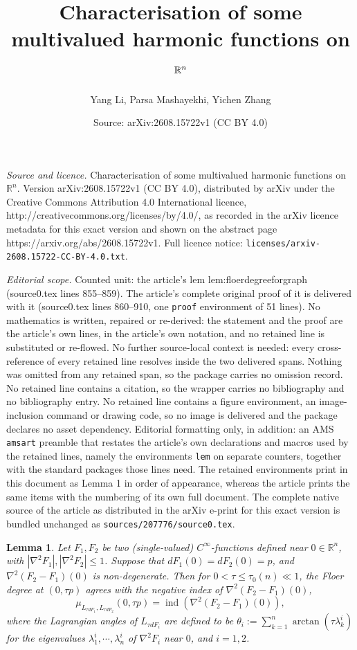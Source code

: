 \documentclass[10pt,a4paper]{amsart}
\title{Characterisation of some multivalued harmonic functions on $\R^{n}$}
\author{Yang Li, Parsa Mashayekhi, Yichen Zhang}
\date{Source: arXiv:2608.15722v1 (CC BY 4.0)}
\newtheorem{lem}{Lemma}
\newcommand{\R}{\mathbb{R}}
\begin{document}
\maketitle

\noindent\emph{Source and licence.} Characterisation of some multivalued harmonic functions on $\R^{n}$. Version arXiv:2608.15722v1 (CC BY 4.0), distributed by arXiv under the Creative Commons Attribution 4.0 International licence, http://creativecommons.org/licenses/by/4.0/, as recorded in the arXiv licence metadata for this exact version and shown on the abstract page https://arxiv.org/abs/2608.15722v1. Full licence notice: \texttt{licenses/arxiv-2608.15722-CC-BY-4.0.txt}.\par\smallskip

\noindent\textit{Editorial scope.} Counted unit: the article's lem lem:floerdegreeforgraph (source0.tex lines 855--859). The article's complete original proof of it is delivered with it (source0.tex lines 860--910, one \texttt{proof} environment of 51 lines). No mathematics is written, repaired or re-derived: the statement and the proof are the article's own lines, in the article's own notation, and no retained line is substituted or re-flowed.  No further source-local context is needed: every cross-reference of every retained line resolves inside the two delivered spans.  Nothing was omitted from any retained span, so the package carries no omission record.  No retained line contains a citation, so the wrapper carries no bibliography and no bibliography entry.  No retained line contains a figure environment, an image-inclusion command or drawing code, so no image is delivered and the package declares no asset dependency.  Editorial formatting only, in addition: an AMS \texttt{amsart} preamble that restates the article's own declarations and macros used by the retained lines, namely the environments \texttt{lem} on separate counters, together with the standard packages those lines need.  The retained environments print in this document as Lemma 1 in order of appearance, whereas the article prints the same items with the numbering of its own full document.  The complete native source of the article as distributed in the arXiv e-print for this exact version is bundled unchanged as \texttt{sources/207776/source0.tex}.
\begin{lem}\label{lem:floerdegreeforgraph} 
      Let $F_1,F_2$ be two (single-valued) $C^\infty$-functions defined near $0\in \R^n$, with $|\nabla^2 F_1|,|\nabla^2 F_2|\leqslant 1$. Suppose that $dF_1(0)=dF_2(0)=p$, and $\nabla^2(F_2-F_1)(0)$ is non-degenerate. Then
      for $0<\tau\leqslant \tau_0(n)\ll 1$, the Floer degree at $(0,\tau p)$ agrees with the negative index of $\nabla^2(F_2-F_1)(0)$, 
      $$\mu_{L_{\tau dF_1},L_{\tau dF_2}}(0,\tau p)=\operatorname{ind}(\nabla^2(F_2-F_1)(0)),$$ where the Lagrangian angles of $L_{\tau dF_i}$ are defined to be $\theta_i:=\sum\limits_{k=1}^n \arctan (\tau \lambda_k^i)$ for the eigenvalues $\lambda_1^i,\cdots,\lambda_n^i$ of $\nabla^2F_i$ near $0$, and $i=1,2$.    
   \end{lem}
\end{document}
